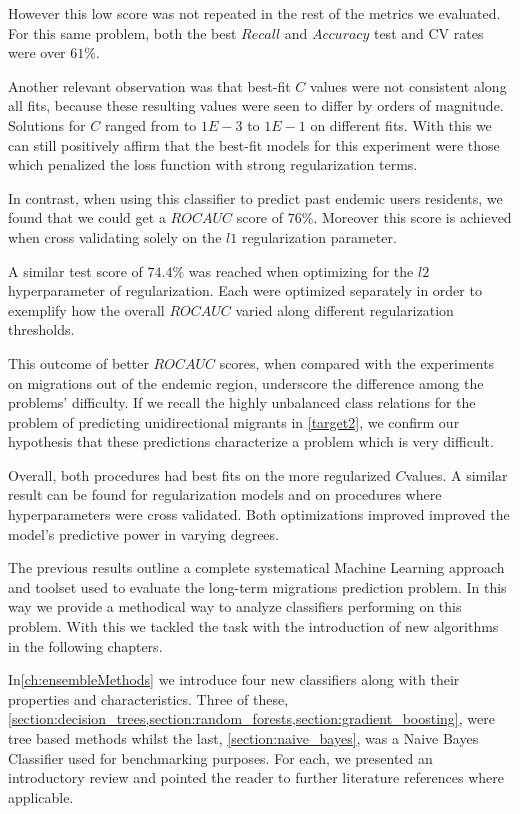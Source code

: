 However this low score was not repeated in the rest of the metrics we evaluated.
For this same problem, both the best $Recall$ and $Accuracy$ test and CV rates were over $61\%$.

Another relevant observation was that best-fit $C$ values were not consistent along all fits, because these resulting values were seen to differ by orders of magnitude.
Solutions for $C$ ranged from to $1E-3$ to $1E-1$ on different fits.
With this we can still positively affirm that the best-fit models for this experiment were those which penalized the loss function with strong regularization terms.


In contrast, when using this classifier to predict past endemic users residents, we found that we could get a $ROC AUC$ score of $76\%$.
Moreover this score is achieved when cross validating solely on the $l1$ regularization parameter.

A similar test score of $74.4\%$ was reached when optimizing for the $l2$ hyperparameter of regularization.
Each were optimized separately in order to exemplify how the overall $ROC AUC$ varied along different regularization thresholds.

This outcome of better $ROC AUC$ scores, when compared with the experiments on migrations out of the endemic region, underscore the difference among the problems' difficulty.
If we recall the highly unbalanced class relations for the problem of predicting unidirectional migrants in \cref{target2}, we confirm our hypothesis that these predictions characterize a problem which is very difficult.

Overall, both procedures had best fits on the more regularized $C$values.
A similar result can be found for regularization models and on procedures where hyperparameters were cross validated.
Both optimizations improved improved the model's predictive power in varying degrees.


The previous results outline a complete systematical Machine Learning approach and toolset used to evaluate the long-term migrations prediction problem.
In this way we provide a methodical way to analyze classifiers performing on this problem.
With this we tackled the task with the introduction of new algorithms in the following chapters.



In\cref{ch:ensembleMethods} we introduce four new classifiers along with their properties and characteristics. Three of these, \cref{section:decision_trees,section:random_forests,section:gradient_boosting}, were tree based methods whilst the last, \cref{section:naive_bayes}, was a Naive Bayes Classifier used for benchmarking purposes.
For each, we presented an introductory review and pointed the reader to further literature references where applicable.

